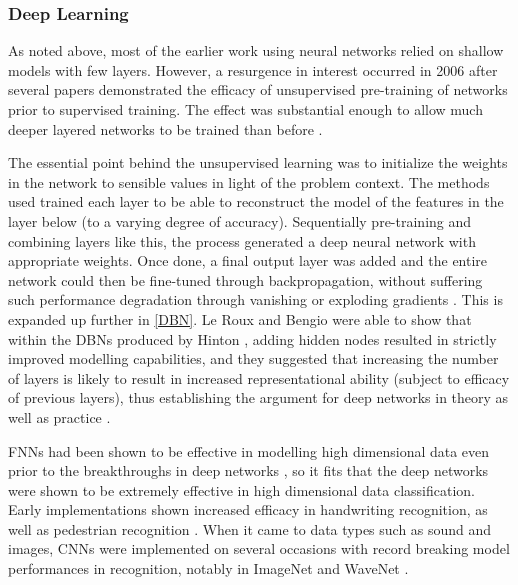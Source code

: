 \documentclass[a4paper,11pt,oneside]{article}
\theoremstyle{plain}
\theoremstyle{definition}
\begin{document}
	\subsubsection{Deep Learning}
	
	As noted above, most of the earlier work using neural networks relied on shallow models with few layers. 
	However, a resurgence in interest occurred in 2006 after several papers demonstrated the efficacy of 
	unsupervised pre-training of networks prior to supervised training. The effect was substantial enough to allow 
	much deeper layered networks to be trained than before \cite{Bengio1, Hinton1}.
	\hfill \break 
	
	The essential point behind the unsupervised learning was to initialize the weights in the network to sensible 
	values in light of the problem context. The methods used trained each layer to be able to reconstruct the model 
	of the features in the layer below (to a varying degree of accuracy). Sequentially pre-training and combining 
	layers like this, the process generated a deep neural network with appropriate weights. Once done, a final output 
	layer was added and the entire network could then be fine-tuned through backpropagation, without suffering 
	such performance degradation through vanishing or exploding gradients \cite{Hinton1, Ranzato1, Hinton2}. This is 
	expanded up further in \ref{DBN}. Le Roux and Bengio were able to show that within the DBNs produced by 
	Hinton \cite{Hinton1}, adding hidden nodes resulted in strictly improved modelling capabilities, and they suggested 
	that increasing the number of layers is likely to result in increased representational ability (subject to efficacy of 
	previous layers), thus establishing the argument for deep networks in theory as well as practice \cite{LeRoux}.
	\hfill \break 
	
	FNNs had been shown to be effective in modelling high dimensional data even prior to the breakthroughs in 
	deep networks \cite{Bengio2}, so it fits that the deep networks were shown to be extremely effective in high dimensional 
	data classification. Early implementations shown increased efficacy in handwriting recognition, as well as pedestrian 
	recognition \cite{Sermanet}. When it came to data types such as sound and images, CNNs were implemented on several 
	occasions with record breaking model performances in recognition, notably in ImageNet and WaveNet \cite{ImageNet, WaveNet}.
	\hfill \break 
	
\end{document}
